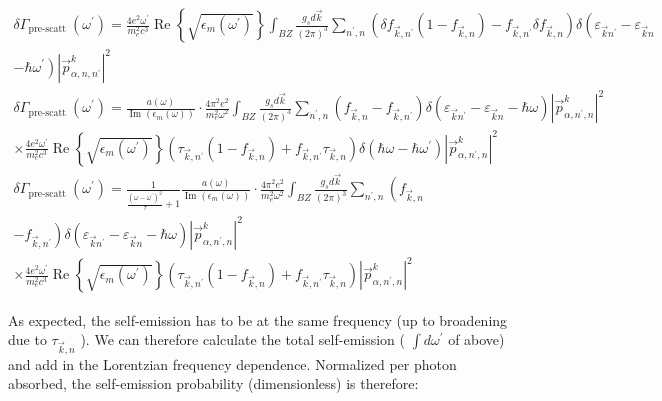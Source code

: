 \documentclass[10pt]{article}
\begin{document}
$$
\begin{gathered}
\delta \Gamma_{\text {pre-scatt }}\left(\omega^{\prime}\right)=\frac{4 e^{2} \omega^{\prime}}{m_{e}^{2} c^{3}} \operatorname{Re}\left\{\sqrt{\epsilon_{m}\left(\omega^{\prime}\right)}\right\} \int_{B Z} \frac{g_{s} d \vec{k}}{(2 \pi)^{3}} \sum_{n^{\prime}, n}\left(\delta f_{\vec{k}, n^{\prime}}\left(1-f_{\vec{k}, n}\right)-f_{\vec{k}, n^{\prime}} \delta f_{\vec{k}, n}\right) \delta\left(\varepsilon_{\vec{k} n^{\prime}}-\varepsilon_{\vec{k} n}\right. \\
\left.-\hbar \omega^{\prime}\right)\left|\vec{p}_{\alpha, n, n^{\prime}}^{k}\right|^{2} \\
\delta \Gamma_{\text {pre-scatt }}\left(\omega^{\prime}\right)=\frac{a(\omega)}{\operatorname{Im}\left(\epsilon_{m}(\omega)\right)} \cdot \frac{4 \pi^{2} e^{2}}{m_{e}^{2} \omega^{2}} \int_{B Z} \frac{g_{s} d \vec{k}}{(2 \pi)^{3}} \sum_{n^{\prime}, n}\left(f_{\vec{k}, n}-f_{\vec{k}, n^{\prime}}\right) \delta\left(\varepsilon_{\vec{k} n^{\prime}}-\varepsilon_{\vec{k} n}-\hbar \omega\right)\left|\vec{p}_{\alpha, n^{\prime}, n}^{k}\right|^{2} \\
\times \frac{4 e^{2} \omega^{\prime}}{m_{e}^{2} c^{3}} \operatorname{Re}\left\{\sqrt{\epsilon_{m}\left(\omega^{\prime}\right)}\right\}\left(\tau_{\vec{k}, n^{\prime}}\left(1-f_{\vec{k}, n}\right)+f_{\vec{k}, n^{\prime}} \tau_{\vec{k}, n}\right) \delta\left(\hbar \omega-\hbar \omega^{\prime}\right)\left|\vec{p}_{\alpha, n^{\prime}, n}^{k}\right|^{2} \\
\delta \Gamma_{\text {pre-scatt }}\left(\omega^{\prime}\right)=\frac{1}{\frac{\left(\omega-\omega^{\prime}\right)^{2}}{\tau}+1} \frac{a(\omega)}{\operatorname{Im}\left(\epsilon_{m}(\omega)\right)} \cdot \frac{4 \pi^{2} e^{2}}{m_{e}^{2} \omega^{2}} \int_{B Z} \frac{g_{s} d \vec{k}}{(2 \pi)^{3}} \sum_{n^{\prime}, n}\left(f_{\vec{k}, n}\right. \\
\left.-f_{\vec{k}, n^{\prime}}\right) \delta\left(\varepsilon_{\vec{k} n^{\prime}}-\varepsilon_{\vec{k} n}-\hbar \omega\right)\left|\vec{p}_{\alpha, n^{\prime}, n}^{k}\right|^{2} \\
\times \frac{4 e^{2} \omega^{\prime}}{m_{e}^{2} c^{3}} \operatorname{Re}\left\{\sqrt{\epsilon_{m}\left(\omega^{\prime}\right)}\right\}\left(\tau_{\vec{k}, n^{\prime}}\left(1-f_{\vec{k}, n}\right)+f_{\vec{k}, n^{\prime}} \tau_{\vec{k}, n}\right)\left|\vec{p}_{\alpha, n^{\prime}, n}^{k}\right|^{2}
\end{gathered}
$$

As expected, the self-emission has to be at the same frequency (up to broadening due to $\tau_{\vec{k}, n}$ ). We can therefore calculate the total self-emission ( $\int d \omega^{\prime}$ of above) and add in the Lorentzian frequency dependence. Normalized per photon absorbed, the self-emission probability (dimensionless) is therefore:
\end{document}
